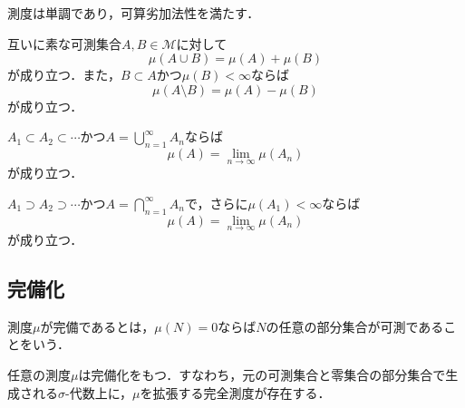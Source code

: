 \begin{proposition}
    測度は単調であり，可算劣加法性を満たす．
\end{proposition}

\begin{proposition}
    互いに素な可測集合$A,B \in \mathcal M$に対して
    \[
    \mu(A \cup B) = \mu(A) + \mu(B)
    \]
    が成り立つ．また，$B \subset A$かつ$\mu(B)<\infty$ならば
    \[
    \mu(A \setminus B) = \mu(A) - \mu(B)
    \]
    が成り立つ．
\end{proposition}

\begin{theorem}
    $A_1 \subset A_2 \subset \cdots$かつ$A=\bigcup_{n=1}^{\infty} A_n$ならば
    \[
    \mu(A) = \lim_{n \to \infty} \mu(A_n)
    \]
    が成り立つ．
\end{theorem}

\begin{theorem}
    $A_1 \supset A_2 \supset \cdots$かつ$A=\bigcap_{n=1}^{\infty} A_n$で，さらに$\mu(A_1)<\infty$ならば
    \[
    \mu(A) = \lim_{n \to \infty} \mu(A_n)
    \]
    が成り立つ．
\end{theorem}

\subsection{完備化}

\begin{definition}
    測度$\mu$が完備であるとは，$\mu(N)=0$ならば$N$の任意の部分集合が可測であることをいう．
\end{definition}

\begin{theorem}
    任意の測度$\mu$は完備化をもつ．すなわち，元の可測集合と零集合の部分集合で生成される$\sigma$-代数上に，$\mu$を拡張する完全測度が存在する．
\end{theorem}
